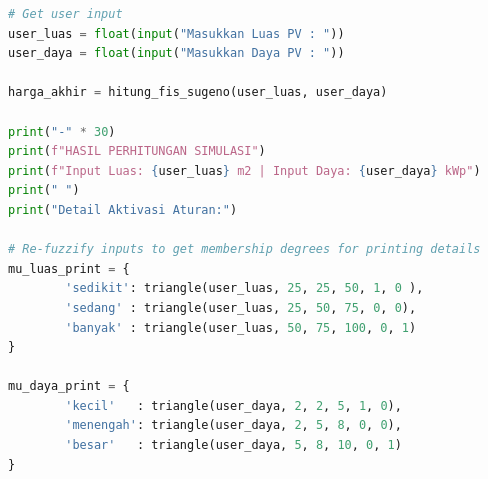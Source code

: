 \documentclass{article}
\begin{document}
\begin{lstlisting}[caption=Menampilkan Hasil Perhitungan, language=Python]
# Get user input
user_luas = float(input("Masukkan Luas PV : "))
user_daya = float(input("Masukkan Daya PV : "))

harga_akhir = hitung_fis_sugeno(user_luas, user_daya)

print("-" * 30)
print(f"HASIL PERHITUNGAN SIMULASI")
print(f"Input Luas: {user_luas} m2 | Input Daya: {user_daya} kWp")
print(" ")
print("Detail Aktivasi Aturan:")

# Re-fuzzify inputs to get membership degrees for printing details
mu_luas_print = {
        'sedikit': triangle(user_luas, 25, 25, 50, 1, 0 ),
        'sedang' : triangle(user_luas, 25, 50, 75, 0, 0),
        'banyak' : triangle(user_luas, 50, 75, 100, 0, 1)
}

mu_daya_print = {
        'kecil'   : triangle(user_daya, 2, 2, 5, 1, 0),
        'menengah': triangle(user_daya, 2, 5, 8, 0, 0),
        'besar'   : triangle(user_daya, 5, 8, 10, 0, 1)
}
\end{lstlisting}
\end{document}
